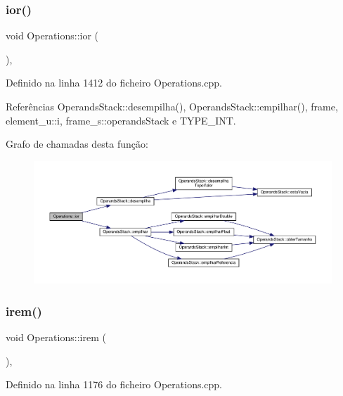 \subsubsection{\texorpdfstring{ior()}{ior()}}
{\footnotesize\ttfamily void Operations\+::ior (\begin{DoxyParamCaption}{ }\end{DoxyParamCaption})\hspace{0.3cm}{\ttfamily [static]}, {\ttfamily [private]}}



Definido na linha 1412 do ficheiro Operations.\+cpp.



Referências Operands\+Stack\+::desempilha(), Operands\+Stack\+::empilhar(), frame, element\+\_\+u\+::i, frame\+\_\+s\+::operands\+Stack e T\+Y\+P\+E\+\_\+\+I\+NT.

Grafo de chamadas desta função\+:
\nopagebreak
\begin{figure}[H]
\begin{center}
\leavevmode
\includegraphics[width=350pt]{classOperations_aaa890c310bc7a93e97b2c5004df94e70_cgraph}
\end{center}
\end{figure}
\mbox{\label{classOperations_a510bd2d155695861597a4413b44565bc}} 
\subsubsection{\texorpdfstring{irem()}{irem()}}
{\footnotesize\ttfamily void Operations\+::irem (\begin{DoxyParamCaption}{ }\end{DoxyParamCaption})\hspace{0.3cm}{\ttfamily [static]}, {\ttfamily [private]}}



Definido na linha 1176 do ficheiro Operations.\+cpp.



